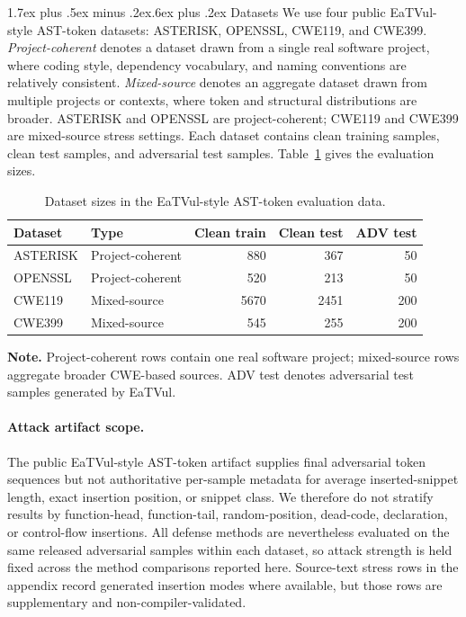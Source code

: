 \documentclass[letterpaper,twocolumn,10pt,twoside]{article}
\makeatletter
\renewcommand\subsection{\@startsection{subsection}{2}{\z@}%
  {1.7ex plus .5ex minus .2ex}{.6ex plus .2ex}%
  {\normalfont\normalsize\bfseries}}
\newcommand{\dataset}[1]{\textsc{#1}}
\makeatother
\begin{document}
\subsection{Datasets}
We use four public EaTVul-style AST-token datasets: \dataset{ASTERISK}, \dataset{OPENSSL}, \dataset{CWE119}, and \dataset{CWE399}. \textit{Project-coherent} denotes a dataset drawn from a single real software project, where coding style, dependency vocabulary, and naming conventions are relatively consistent. \textit{Mixed-source} denotes an aggregate dataset drawn from multiple projects or contexts, where token and structural distributions are broader. \dataset{ASTERISK} and \dataset{OPENSSL} are project-coherent; \dataset{CWE119} and \dataset{CWE399} are mixed-source stress settings. Each dataset contains clean training samples, clean test samples, and adversarial test samples. Table~\ref{tab:datasets} gives the evaluation sizes.

\begin{table}[tbp]
\centering
\caption{Dataset sizes in the EaTVul-style AST-token evaluation data.}
\label{tab:datasets}
\scriptsize
\setlength{\tabcolsep}{2.5pt}
\begin{tabular}{llrrr}
\toprule
Dataset & Type & Clean train & Clean test & ADV test \\
\midrule
\dataset{ASTERISK} & Project-coherent & 880 & 367 & 50 \\
\dataset{OPENSSL} & Project-coherent & 520 & 213 & 50 \\
\dataset{CWE119} & Mixed-source & 5670 & 2451 & 200 \\
\dataset{CWE399} & Mixed-source & 545 & 255 & 200 \\
\bottomrule
\end{tabular}
\vspace{2pt}
\par\footnotesize\textbf{Note.} Project-coherent rows contain one real software project; mixed-source rows aggregate broader CWE-based sources. ADV test denotes adversarial test samples generated by EaTVul.
\end{table}

\paragraph{Attack artifact scope.} The public EaTVul-style AST-token artifact supplies final adversarial token sequences but not authoritative per-sample metadata for average inserted-snippet length, exact insertion position, or snippet class. We therefore do not stratify results by function-head, function-tail, random-position, dead-code, declaration, or control-flow insertions. All defense methods are nevertheless evaluated on the same released adversarial samples within each dataset, so attack strength is held fixed across the method comparisons reported here. Source-text stress rows in the appendix record generated insertion modes where available, but those rows are supplementary and non-compiler-validated.
\end{document}
